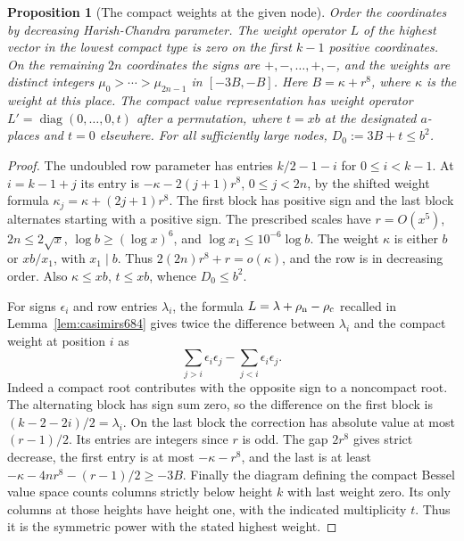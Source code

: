 \documentclass[a4paper,11pt]{article}
\newtheorem{proposition}{Proposition}[section]
\theoremstyle{definition}
\theoremstyle{remark}
\numberwithin{equation}{section}
\begin{document}
\begin{proposition}[The compact weights at the given node]\leavevmode
\label{prop:stationaryweights695}
Order the coordinates by decreasing Harish-Chandra parameter.
The weight operator \(L\) of the highest vector in the lowest
compact type is zero on the first \(k-1\) positive coordinates.
On the remaining \(2n\) coordinates the signs are
\(+,-,\ldots,+,-\), and the weights are distinct integers
\(\mu_0>\cdots>\mu_{2n-1}\) in \([-3B,-B]\). Here
\(B=\kappa+r^8\), where \(\kappa\) is the weight at this place.
The compact value representation has weight operator
\(L'=\operatorname{diag}(0,\ldots,0,t)\) after a permutation,
where \(t=xb\) at the designated \(a\)-places and \(t=0\)
elsewhere. For all sufficiently large nodes,
\(D_0:=3B+t\le b^2\).
\end{proposition}
\begin{proof}
The undoubled row parameter has entries \(k/2-1-i\) for
\(0\le i<k-1\). At \(i=k-1+j\) its entry is
\(-\kappa-2(j+1)r^8\), \(0\le j<2n\), by the shifted weight
formula \(\kappa_j=\kappa+(2j+1)r^8\). The first block
has positive sign and the last block alternates starting with
a positive sign. The prescribed scales have \(r=O(x^5)\),
\(2n\le 2\sqrt{x}\), \(\log b\ge(\log x)^6\), and
\(\log x_1\le 10^{-6}\log b\). The weight \(\kappa\) is
either \(b\) or \(xb/x_1\), with \(x_1\mid b\). Thus
\(2(2n)r^8+r=o(\kappa)\), and the row is in decreasing
order. Also \(\kappa\le xb\), \(t\le xb\), whence \(D_0\le b^2\).

For signs \(\epsilon_i\) and row entries \(\lambda_i\), the
formula \(L=\lambda+\rho_{\rm n}-\rho_{\rm c}\) recalled in
Lemma~\ref{lem:casimirs684} gives twice the difference between
\(\lambda_i\) and the compact weight at position \(i\) as
\[
        \sum_{j>i}\epsilon_i\epsilon_j
                 -\sum_{j<i}\epsilon_i\epsilon_j .
\]
Indeed a compact root contributes with the opposite sign to a
noncompact root. The alternating block has sign sum zero, so
the difference on the first block is \((k-2-2i)/2=\lambda_i\).
On the last block the correction has absolute value at most
\((r-1)/2\). Its entries are integers since \(r\) is odd.
The gap \(2r^8\) gives strict decrease, the first entry is at
most \(-\kappa-r^8\), and the last is at least
\(-\kappa-4nr^8-(r-1)/2\ge-3B\). Finally the diagram defining
the compact Bessel value space counts columns strictly below
height \(k\) with last weight zero. Its only columns at those
heights have height one, with the indicated multiplicity \(t\).
Thus it is the symmetric power with the stated highest weight.
\end{proof}
\end{document}
